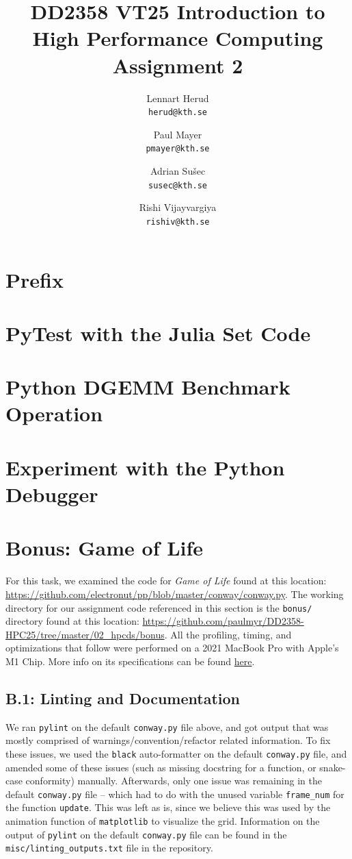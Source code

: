 \documentclass[a4paper,12pt]{article}
\title{
  \normalsize{DD2358 VT25 Introduction to}\\
  \normalsize{High Performance Computing}\\
  \large{Assignment 2}\\
}
\author{
  \small Lennart Herud\\[-0.75ex]
  \scriptsize\texttt{herud@kth.se}
  \and
    \small Paul Mayer\\[-0.75ex]
  \scriptsize\texttt{pmayer@kth.se}
  \and
    \small Adrian Sušec\\[-0.75ex]
  \scriptsize\texttt{susec@kth.se}
  \and
  \small Rishi Vijayvargiya\\[-0.75ex]
  \scriptsize\texttt{rishiv@kth.se}
}
\date{}
\begin{document}
\maketitle
\thispagestyle{firstpagestyle}

\listoftodos

\vspace{1em}

%
\section*{Prefix}

%

\section{PyTest with the Julia Set Code}
\section{Python DGEMM Benchmark Operation}
\section{Experiment with the Python Debugger}
\section{Bonus: Game of Life}
For this task, we examined the code for \textit{Game of Life} found at this location: \url{https://github.com/electronut/pp/blob/master/conway/conway.py}. The working directory for our assignment code referenced in this section is the \verb|bonus/| directory found at this location: \url{https://github.com/paulmyr/DD2358-HPC25/tree/master/02_hpcds/bonus}. All the profiling, timing, and optimizations that follow were performed on a 2021 MacBook Pro with Apple's M1 Chip. More info on its specifications can be found \href{https://support.apple.com/en-us/111901}{here}.
\subsection{B.1: Linting and Documentation}
We ran \verb|pylint| on the default \verb|conway.py| file above, and got output that was mostly comprised of warnings/convention/refactor related information. To fix these issues, we used the \verb|black| auto-formatter on the default \verb|conway.py| file, and amended some of these issues (such as missing docstring for a function, or snake-case conformity) manually. Afterwards, only one issue was remaining in the default \verb|conway.py| file -- which had to do with the unused variable \verb|frame_num| for the function \verb|update|. This was left as is, since we believe this was used by the animation function of \verb|matplotlib| to visualize the grid. Information on the output of \verb|pylint| on the default \verb|conway.py| file can be found in the \verb|misc/linting_outputs.txt| file in the repository. 
\end{document}

